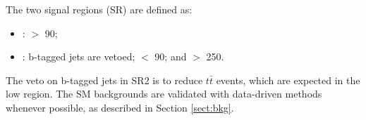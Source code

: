 The two signal regions (SR) are defined as:
\begin{itemize}
\item {\bf \binone}: \mttwo $>$ 90\GeV;
\item {\bf \bintwo}: b-tagged jets are vetoed; \mttwo $<$ 90\GeV; and \SumMT $>$ 250\GeV.
\end{itemize}
The veto on b-tagged jets in SR2 is  to reduce
$t\bar{t}$ events, which
are expected in  the low \mttwo region. 
The SM backgrounds are validated with data-driven methods whenever possible, as described in Section \ref{sect:bkg}.

